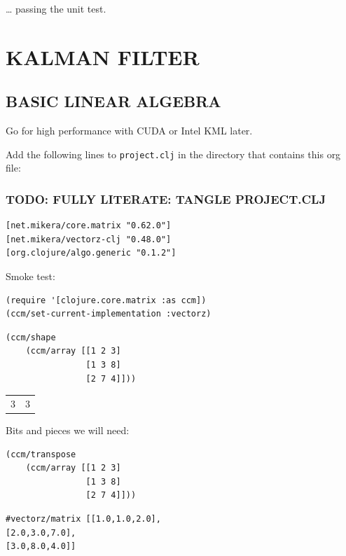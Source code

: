 \documentclass[10pt,oneside,x11names]{article}
\begin{document}
\ldots{}  passing the unit test.

\section{KALMAN FILTER}
\label{kalman-filter}
\subsection{BASIC LINEAR ALGEBRA}
\label{basic-linear-algebra}
Go for high performance with CUDA or Intel KML later.

Add the following lines to \texttt{project.clj} in the directory that contains this
org file:

\subsubsection{TODO: FULLY LITERATE: TANGLE PROJECT.CLJ}
\label{sec:orgffca48b}

\begin{verbatim}
[net.mikera/core.matrix "0.62.0"]
[net.mikera/vectorz-clj "0.48.0"]
[org.clojure/algo.generic "0.1.2"]
\end{verbatim}

Smoke test:

\begin{verbatim}
(require '[clojure.core.matrix :as ccm])
(ccm/set-current-implementation :vectorz)
\end{verbatim}

\begin{verbatim}
(ccm/shape
    (ccm/array [[1 2 3]
                [1 3 8]
                [2 7 4]]))
\end{verbatim}

\begin{center}
\begin{tabular}{rr}
3 & 3\\
\end{tabular}
\end{center}

Bits and pieces we will need:

\begin{verbatim}
(ccm/transpose
    (ccm/array [[1 2 3]
                [1 3 8]
                [2 7 4]]))
\end{verbatim}

\begin{verbatim}
#vectorz/matrix [[1.0,1.0,2.0],
[2.0,3.0,7.0],
[3.0,8.0,4.0]]
\end{verbatim}
\end{document}
